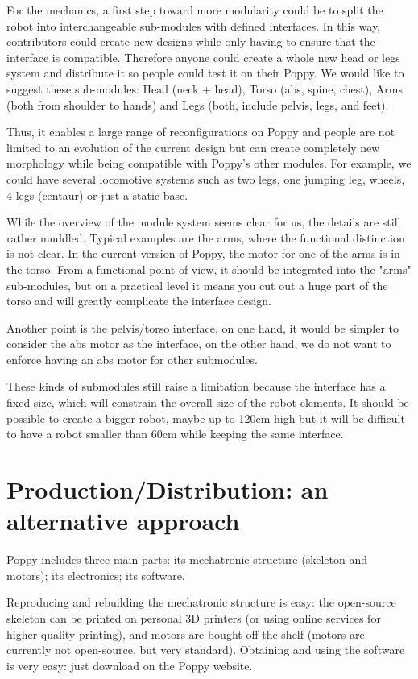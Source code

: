 For the mechanics, a first step toward more modularity could be to split the robot into interchangeable sub-modules with defined interfaces. In this way, contributors could create new designs while only having to ensure that the interface is compatible. Therefore anyone could create a whole new head or legs system and distribute it so people could test it on their Poppy.
We would like to suggest these sub-modules: Head (neck + head), Torso (abs, spine, chest), Arms (both from shoulder to hands) and Legs (both, include pelvis, legs, and feet).

Thus, it enables a large range of reconfigurations on Poppy and people are not limited to an evolution of the current design but can create completely new morphology while being compatible with Poppy's other modules.
For example, we could have several locomotive systems such as two legs, one jumping leg, wheels, 4 legs (centaur) or just a static base.

While the overview of the module system seems clear for us, the details are still rather muddled. Typical examples are the arms, where the functional distinction is not clear. In the current version of Poppy, the motor for one of the arms is in the torso. From a functional point of view, it should be integrated into the "arms" sub-modules, but on a practical level it means you cut out a huge part of the torso and will greatly complicate the interface design.

Another point is the pelvis/torso interface, on one hand, it would be simpler to consider the abs motor as the interface, on the other hand, we do not want to enforce having an abs motor for other submodules.

These kinds of submodules still raise a limitation because the interface has a fixed size, which will constrain the overall size of the robot elements. It should be possible to create a bigger robot, maybe up to 120cm high but it will be difficult to have a robot smaller than 60cm while keeping the same interface.


\section{Production/Distribution: an alternative approach} %

Poppy includes three main parts: its mechatronic structure (skeleton and motors); its electronics; its software.

Reproducing and rebuilding the mechatronic structure is easy: the open-source skeleton can be printed on personal 3D printers (or using online services for higher quality printing), and motors are bought off-the-shelf (motors are currently not open-source, but very standard). Obtaining and using the software is very easy: just download on the Poppy website.

